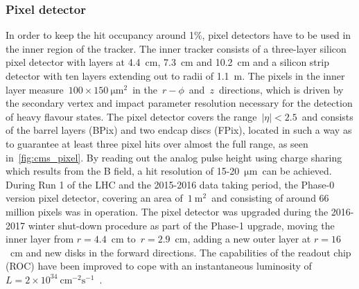 \subsubsection{Pixel detector}
In order to keep the hit occupancy around 1\%, pixel detectors have to be used in the inner region of the tracker. The inner tracker consists of a three-layer silicon pixel detector with layers at 4.4~cm, 7.3~cm and 10.2~cm and a silicon strip detector with ten layers extending out to radii of 1.1~m. The pixels in the inner layer measure~$100\times150~\mathrm{\mu m}^2$~in the~$r-\phi$~and~$z$~directions, which is driven by the secondary vertex and impact parameter resolution necessary for the detection of heavy flavour states. The pixel detector covers the range~$|\eta| < 2.5$~and consists of the barrel layers (BPix) and two endcap discs (FPix), located in such a way as to guarantee at least three pixel hits over almost the full range, as seen in~\cref{fig:cms_pixel}. By reading out the analog pulse height using charge sharing which results from the B field, a hit resolution of 15-20~$\mathrm{\mu m}$~can be achieved. During Run 1 of the LHC and the 2015-2016 data taking period, the Phase-0 version pixel detector, covering an area of~$1~\mathrm{m}^2$~and consisting of around 66 million pixels was in operation. The pixel detector was upgraded during the 2016-2017 winter shut-down procedure as part of the Phase-1 upgrade, moving the inner layer from $r=4.4$~cm to~$r=2.9$~cm, adding a new outer layer at $r=16$~cm and new disks in the forward directions. The capabilities of the readout chip (ROC) have been improved to cope with an instantaneous luminosity of~$L = 2 \times 10^{34}\ \mathrm{cm}^{-2}\mathrm{s}^{-1}$~\cite{Tavolaro:2016hfj}.

